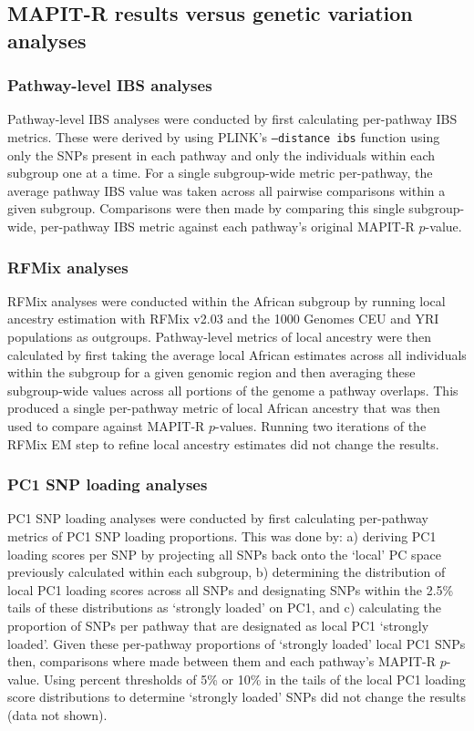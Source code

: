 \documentclass[10pt,a4paper]{article}
\begin{document}
\subsection*{MAPIT-R results versus genetic variation analyses}
\subsubsection*{Pathway-level IBS analyses}

Pathway-level IBS analyses were conducted by first calculating per-pathway IBS metrics. These were derived by using PLINK's \texttt{--distance ibs} function \citep{Purcell2007} using only the SNPs present in each pathway and only the individuals within each subgroup one at a time. For a single subgroup-wide metric per-pathway, the average pathway IBS value was taken across all pairwise comparisons within a given subgroup. Comparisons were then made by comparing this single subgroup-wide, per-pathway IBS metric against each pathway's original MAPIT-R $p$-value.

\subsubsection{RFMix analyses}

RFMix analyses were conducted within the African subgroup by running local ancestry estimation with RFMix v2.03 \citep{Maples2013} and the 1000 Genomes CEU and YRI populations \citep{Genomes2015} as outgroups. Pathway-level metrics of local ancestry were then calculated by first taking the average local African estimates across all individuals within the subgroup for a given genomic region and then averaging these subgroup-wide values across all portions of the genome a pathway overlaps. This produced a single per-pathway metric of local African ancestry that was then used to compare against MAPIT-R $p$-values. Running two iterations of the RFMix EM step to refine local ancestry estimates did not change the results.

\subsubsection{PC1 SNP loading analyses}

PC1 SNP loading analyses were conducted by first calculating per-pathway metrics of PC1 SNP loading proportions. This was done by: a) deriving PC1 loading scores per SNP by projecting all SNPs back onto the `local' PC space previously calculated within each subgroup, b) determining the distribution of local PC1 loading scores across all SNPs and designating SNPs within the 2.5\% tails of these distributions as `strongly loaded' on PC1, and c) calculating the proportion of SNPs per pathway that are designated as local PC1 `strongly loaded'. Given these per-pathway proportions of `strongly loaded' local PC1 SNPs then, comparisons where made between them and each pathway's MAPIT-R $p$-value. Using percent thresholds of 5\% or 10\% in the tails of the local PC1 loading score distributions to determine `strongly loaded' SNPs did not change the results (data not shown).
\end{document}
